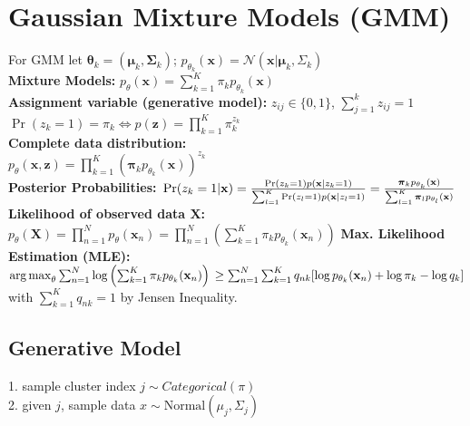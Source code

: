 \section{Gaussian Mixture Models (GMM)}
For GMM let $\boldsymbol{\theta}_k = (\boldsymbol{\mu}_k, \boldsymbol{\Sigma}_k)$; $p_{\theta_k}(\mathbf{x}) = \mathcal{N}(\mathbf{x} | \boldsymbol{\mu}_k, \Sigma_k)$\\
\textbf{Mixture Models:} $p_\theta(\mathbf{x}) = \sum_{k=1}^K \pi_k p_{\theta_k}(\mathbf{x})$\\
\textbf{Assignment variable (generative model):} $z_{ij} \in \{0, 1\}$, $\sum_{j=1}^k z_{ij} = 1$\\
$\operatorname{Pr}(z_k = 1) = \pi_k \Leftrightarrow p(\mathbf{z}) = \prod_{k=1}^K \pi_k^{z_k}$\\
\textbf{Complete data distribution:}\\
$p_\theta(\mathbf{x}, \mathbf{z}) = \prod_{k=1}^K \left( \boldsymbol{\pi}_k p_{\theta_k}(\mathbf{x})\right)^{z_k}$\\
\textbf{Posterior Probabilities:} $\\\operatorname{Pr}(z_k = 1 | \mathbf{x}) = \frac{\operatorname{Pr}(z_k = 1) p(\mathbf{x} | z_k = 1)}{\sum_{l=1}^K \operatorname{Pr}(z_l = 1) p(\mathbf{x} | z_l = 1)} = \frac{\boldsymbol{\pi}_k p_{\theta_k}(\mathbf{x})}{\sum_{l=1}^K \boldsymbol{\pi}_l p_{\theta_l}(\mathbf{x})}$
\textbf{Likelihood of observed data $\mathbf{X}$:}\\
$p_\theta(\mathbf{X}) = \prod_{n=1}^N p_\theta(\mathbf{x}_n) = \prod_{n=1}^N \left(\sum_{k=1}^K \pi_k p_{\theta_k}(\mathbf{x}_n)\right)$
\textbf{Max. Likelihood Estimation (MLE):}\\
$\operatorname*{arg\,max}_\theta\sum_{n=1}^N \log \left( \sum_{k=1}^K \pi_k p_{\theta_k}(\mathbf{x}_n)\right)\\
\ge \sum_{n=1}^N \sum_{k=1}^K{q_{nk}[\log p_{\theta_k}(\mathbf{x}_n) + \log \pi_k - \log q_k]}$\\
with $\sum_{k=1}^K{q_{nk}} = 1$ by Jensen Inequality.

\subsection*{Generative Model}
1. sample cluster index $j \sim Categorical(\pi)$\\
2. given $j$, sample data $x \sim \text{Normal}(\mu_j, \Sigma_j)$


